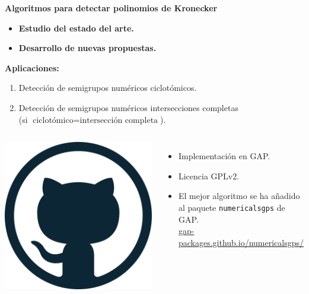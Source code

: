 \documentclass[10pt,compress]{beamer}
\begin{document}
\begin{frame}
  \begin{center}
  {\color{ChetwodeBlue}\Large\textbf{Algoritmos para detectar polinomios de Kronecker}}    
  \end{center}

\begin{tcolorbox}[colback=ChetwodeBlue!10,colframe=ChetwodeBlue!60]
\begin{itemize}
\item \textbf{Estudio del estado del arte.}
\item \textbf{Desarrollo de nuevas propuestas.}
\end{itemize}
  {\color{TurkishRose} \textbf{Aplicaciones:}}
  \begin{enumerate}
\item Detección de semigrupos numéricos ciclotómicos.
\item Detección de semigrupos numéricos intersecciones completas \\
      (si $\text{ciclotómico} = \text{intersección completa}$).
\end{enumerate}
  \end{tcolorbox}

  \begin{columns}
  \includegraphics[width=\textwidth]{./images/github.png}
  
  \begin{itemize}
  \item Implementación en GAP.
  \item Licencia GPLv2.
  \item El mejor algoritmo se ha añadido al paquete \texttt{numericalsgps} de GAP. \\ \url{gap-packages.github.io/numericalsgps/}
  \end{itemize}
  \end{columns}

\end{frame}
\end{document}
